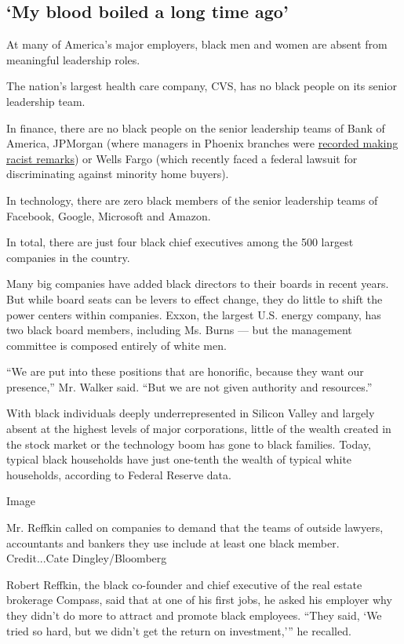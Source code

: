 \hypertarget{my-blood-boiled-a-long-time-ago}{%
\subsection{`My blood boiled a long time
ago'}\label{my-blood-boiled-a-long-time-ago}}

At many of America's major employers, black men and women are absent
from meaningful leadership roles.

The nation's largest health care company, CVS, has no black people on
its senior leadership team.

In finance, there are no black people on the senior leadership teams of
Bank of America, JPMorgan (where managers in Phoenix branches were
\href{https://www.nytimes3xbfgragh.onion/2019/12/11/business/jpmorgan-banking-racism.html}{recorded
making racist remarks}) or Wells Fargo (which recently faced a federal
lawsuit for discriminating against minority home buyers).

In technology, there are zero black members of the senior leadership
teams of Facebook, Google, Microsoft and Amazon.

In total, there are just four black chief executives among the 500
largest companies in the country.

Many big companies have added black directors to their boards in recent
years. But while board seats can be levers to effect change, they do
little to shift the power centers within companies. Exxon, the largest
U.S. energy company, has two black board members, including Ms. Burns
--- but the management committee is composed entirely of white men.

``We are put into these positions that are honorific, because they want
our presence,'' Mr. Walker said. ``But we are not given authority and
resources.''

With black individuals deeply underrepresented in Silicon Valley and
largely absent at the highest levels of major corporations, little of
the wealth created in the stock market or the technology boom has gone
to black families. Today, typical black households have just one-tenth
the wealth of typical white households, according to Federal Reserve
data.

Image

Mr. Reffkin called on companies to demand that the teams of outside
lawyers, accountants and bankers they use include at least one black
member. Credit...Cate Dingley/Bloomberg

Robert Reffkin, the black co-founder and chief executive of the real
estate brokerage Compass, said that at one of his first jobs, he asked
his employer why they didn't do more to attract and promote black
employees. ``They said, `We tried so hard, but we didn't get the return
on investment,''' he recalled.


